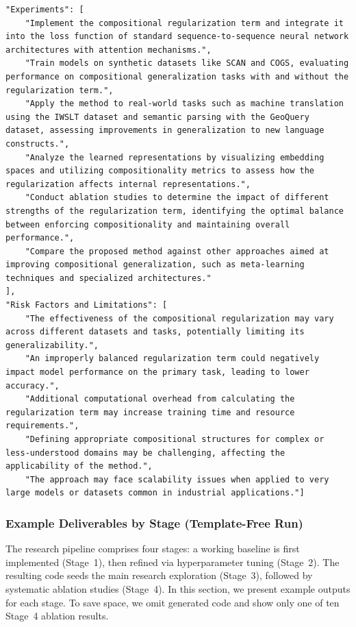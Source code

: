 \begin{appendices}
\begin{tcolorbox}[breakable, colback=orange!5!white, colframe=orange!80!black, title=Example idea generated for the ICLR ICBINB workshop experiment]
\begin{Verbatim}[breaklines, breaksymbol={}, breaksymbolleft={}, fontsize=\small]
"Experiments": [
    "Implement the compositional regularization term and integrate it into the loss function of standard sequence-to-sequence neural network architectures with attention mechanisms.",
    "Train models on synthetic datasets like SCAN and COGS, evaluating performance on compositional generalization tasks with and without the regularization term.",
    "Apply the method to real-world tasks such as machine translation using the IWSLT dataset and semantic parsing with the GeoQuery dataset, assessing improvements in generalization to new language constructs.",
    "Analyze the learned representations by visualizing embedding spaces and utilizing compositionality metrics to assess how the regularization affects internal representations.",
    "Conduct ablation studies to determine the impact of different strengths of the regularization term, identifying the optimal balance between enforcing compositionality and maintaining overall performance.",
    "Compare the proposed method against other approaches aimed at improving compositional generalization, such as meta-learning techniques and specialized architectures."
],
"Risk Factors and Limitations": [
    "The effectiveness of the compositional regularization may vary across different datasets and tasks, potentially limiting its generalizability.",
    "An improperly balanced regularization term could negatively impact model performance on the primary task, leading to lower accuracy.",
    "Additional computational overhead from calculating the regularization term may increase training time and resource requirements.",
    "Defining appropriate compositional structures for complex or less-understood domains may be challenging, affecting the applicability of the method.",
    "The approach may face scalability issues when applied to very large models or datasets common in industrial applications."]
\end{Verbatim}
\end{tcolorbox}

\subsubsection{Example Deliverables by Stage (Template-Free Run)}

The research pipeline comprises four stages: a working baseline is first implemented (Stage~1), then refined via hyperparameter tuning (Stage~2). The resulting code seeds the main research exploration (Stage~3), followed by systematic ablation studies (Stage~4).
In this section, we present example outputs for each stage. To save space, we omit generated code and show only one of ten Stage~4 ablation results.


\end{appendices}
